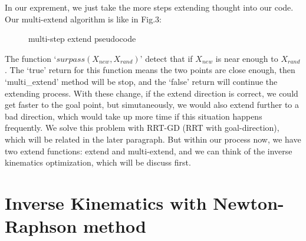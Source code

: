 \documentclass[letterpaper, 10 pt, conference]{ieeeconf}  %
\begin{document}
In our exprement, we just take the more steps extending thought into our code. Our multi-extend algorithm is like in Fig.3:

\begin{figure}[thpb]
      \centering
      \caption{multi-step extend pseudocode}
      \label{figurelabe3}
\end{figure}

The function `$surpass(X_{new},X_{rand})$' detect that if $X_{new}$ is near enough to $X_{rand}$. The `true' return for this function means the two points are close enough, then `multi\_extend' method will be stop, and the `false' return will continue the extending process.  With these change, if the extend direction is correct, we could get faster to the goal point, but simutaneously, we would also extend further to a bad direction, which would take up more time if this situation happens frequently. We solve this problem with RRT-GD (RRT with goal-direction), which will be related in the later paragraph. But within our process now, we have two extend functions: extend and multi-extend, and we can think of the inverse kinematics optimization, which will be discuss first.

\section{Inverse Kinematics with Newton-Raphson method}
\end{document}
